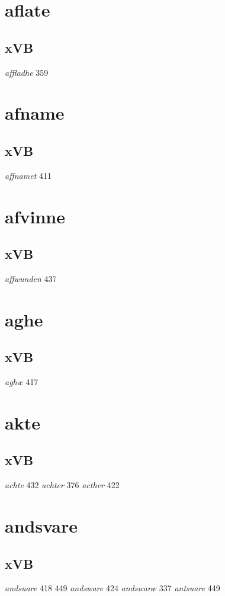 \documentclass[a4paper,twocolumn]{article}
\begin{document}
\section{aflate}
\label{sec:orgb1acf0d}
\subsection{xVB}
\label{sec:orgf76fe51}
\emph{affladhe} 359 
\section{afname}
\label{sec:org36aff6d}
\subsection{xVB}
\label{sec:org673ff83}
\emph{affnamet} 411 
\section{afvinne}
\label{sec:org9e78950}
\subsection{xVB}
\label{sec:org565b39f}
\emph{affwunden} 437 
\section{aghe}
\label{sec:org563e2e4}
\subsection{xVB}
\label{sec:org318c810}
\emph{aghæ} 417 
\section{akte}
\label{sec:org9923c56}
\subsection{xVB}
\label{sec:org8aecd4b}
\emph{achte} 432 \emph{achter} 376 \emph{acther} 422 
\section{andsvare}
\label{sec:orga7371d8}
\subsection{xVB}
\label{sec:org9f40122}
\emph{andsuare} 418 449 \emph{andsware} 424 \emph{andswaræ} 337 \emph{antsuare} 449 
\end{document}
